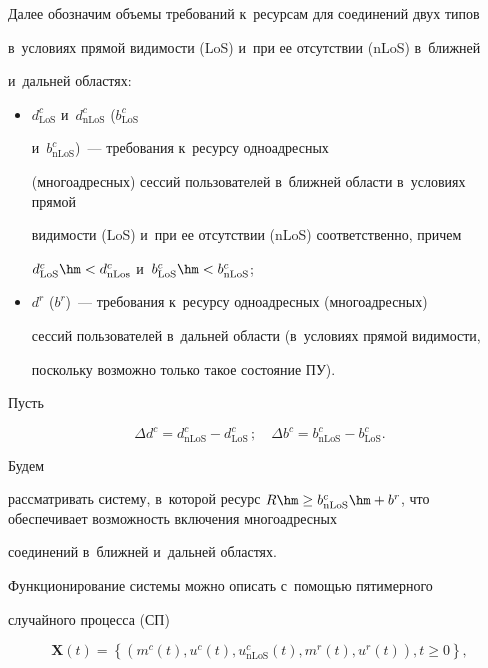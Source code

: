    Далее обозначим объемы требований к~ресурсам для соединений двух типов 

в~условиях прямой ви\-ди\-мости (LoS) и~при ее отсутствии (nLoS) в~ближ\-ней 

и~дальней областях:

   \begin{itemize}

\item $d^c_{\mathrm{LoS}}$ и~$d^c_{\mathrm{nLoS}}$ ($b^c_{\mathrm{LoS}}$ 

и~$b^c_{\mathrm{nLoS}}$)~--- требования к~ресурсу одноадресных 

(многоадресных) сессий пользователей в~ближ\-ней об\-ласти в~условиях прямой 

видимости (LoS) и~при ее отсутствии (nLoS) соответственно, причем 

$d^c_{\mathrm{LoS}}\hm< d^c_{\mathrm{nLos}}$ и~$b^c_{\mathrm{LoS}}\hm<  b^c_{\mathrm{nLoS}}$;

\item $d^r$ ($b^r$)~--- требования к~ресурсу одноадресных (многоадресных) 

сессий пользователей в~дальней об\-ласти (в~условиях прямой ви\-ди\-мости, 

поскольку воз\-мож\-но только такое со\-сто\-яние ПУ).

\end{itemize}



Пусть 

$$

\Delta d^c= d^c_{\mathrm{nLoS}} - d^c_{\mathrm{LoS}}\,;\quad

\Delta  b^c = b^c_{\mathrm{nLoS}} - b^c_{\mathrm{LoS}}.

$$

 Будем 

рассматривать сис\-те\-му, в~которой ресурс $R\hm\geq b^c_{\mathrm{nLoS}} 

\hm+ b^r$, что обеспечивает воз\-мож\-ность включения многоадресных 

со\-еди\-не\-ний в~ближ\-ней и~дальней областях.



  Функционирование системы можно описать с~по\-мощью пятимерного 

случайного процесса (СП)

  \begin{equation*}

  \bm{X}(t) =\left\{ \left( m^c(t), u^c(t), u^c_{\mathrm{nLoS}}(t), m^r(t), 

u^r(t)\right), t\geq 0\right\},


  \end{equation*}

